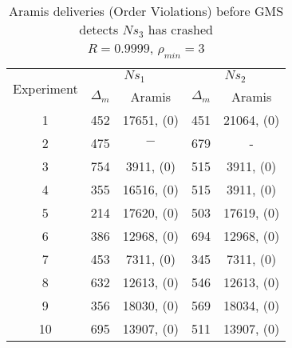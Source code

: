 \begin{table}[p]
    \begin{center}
        \renewcommand{\arraystretch}{1.25}
        \begin{tabular}{|c|c|c|c|c|}
            \hline
            \multirow{2}{*}{Experiment} & \multicolumn{2}{|c|}{$Ns_1$} & \multicolumn{2}{|c|}{$Ns_2$} \\ \cline{2-5}
                                                       & $\Delta_m$&\textsf{Aramis} & $\Delta_m$&\textsf{Aramis} \\ \hline \hline
            1 & 452 & 17651, (0) & 451 & 21064, (0) \\ \hline
            2 & 475 & $-$ & 679 & - \\ \hline
            3 & 754 & 3911, (0) & 515 & 3911, (0)  \\ \hline
            4 & 355 & 16516, (0) & 515 & 3911, (0)  \\ \hline
            5 & 214 & 17620, (0) & 503 & 17619, (0)  \\ \hline
            6 & 386 & 12968, (0) & 694 & 12968, (0)  \\ \hline
            7 & 453 & 7311, (0) & 345 & 7311, (0)  \\ \hline
            8 & 632 & 12613, (0) & 546 & 12613, (0)  \\ \hline
            9 & 356 & 18030, (0) & 569 & 18034, (0)  \\ \hline
            10 & 695 & 13907, (0) & 511 & 13907, (0)  \\ \hline
        \end{tabular}
        \caption[\textsf{Aramis} deliveries before GMS detects node crash ($R=0.9999$, $\rho_{min}=3$)]{\textsf{Aramis} deliveries (Order Violations) before GMS detects $Ns_3$ has crashed \\ $R=0.9999$, $\rho_{min}=3$}
        \label{table:crashed_node_rho3}
    \end{center}
\end{table}

